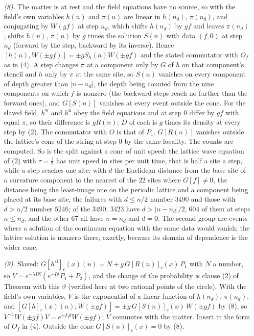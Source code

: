\emph{(8).} The matter is at rest and the field equations have no source, so with the field's own variables $h(n)$ and $\pi(n)$ are linear in $h(n_{d})$, $\pi(n_{d})$, and conjugating by $W(gf)$ at step $n_{d}$, which shifts $h(n_{d})$ by $gf$ and leaves $\pi(n_{d})$, shifts $h(n)$, $\pi(n)$ by $g$ times the solution $S(n)$ with data $(f, 0)$ at step $n_{d}$ (forward by the step, backward by its inverse). Hence $[h(n), W(\pm gf)] = \pm gS_{h}(n)W(\pm gf)$ and the stated commutator with $O_{f}$ as in (4). A step changes $\pi$ at a component only by $G$ of $h$ on that component's stencil and $h$ only by $\pi$ at the same site, so $S(n)$ vanishes on every component of depth greater than $|n - n_{d}|$, the depth being counted from the nine components on which $f$ is nonzero (the backward steps reach no further than the forward ones), and $G[S(n)]$ vanishes at every event outside the cone. For the slaved field, $h^{\mathrm{w}}$ and $h^{\mathrm{n}}$ obey the field equations and at step $0$ differ by $gf$ with equal $\pi$, so their difference is $gR(n)$; $D$ of each is $g$ times its density at every step by (2). The commutator with $O$ is that of $P_{1}$. $G[R(n)]$ vanishes outside the lattice's cone of the string at step $0$ by the same locality. The counts are computed. So is the split against a cone of unit speed: the lattice wave equation of (2) with $\tau = \tfrac12$ has unit speed in sites per unit time, that is half a site a step, while a step reaches one site; with $d$ the Euclidean distance from the base site of a curvature component to the nearest of the $22$ sites where $G[f] \neq 0$, the distance being the least-image one on the periodic lattice and a component being placed at its base site, the failures with $d \le n/2$ number $3490$ and those with $d > n/2$ number $5246$; of the $3490$, $3423$ have $d > |n - n_{d}|/2$, $604$ of them at steps $n \le n_{d}$, and the other $67$ all have $n = n_{d}$ and $d = 0$. The second group are events where a solution of the continuum equation with the same data would vanish; the lattice solution is nonzero there, exactly, because its domain of dependence is the wider cone.

\emph{(9).} Slaved: $G[h^{\mathrm{sl}}]_{c}(x)(n) = N + g\,G[R(n)]_{c}(x)\,P_{1}$ with $N$ a number, so $V = e^{-\lambda IN}(e^{-I\vartheta}P_{1} + P_{2})$, and the change of the probability is clause (2) of Theorem  with this $\vartheta$ (verified here at two rational points of the circle). With the field's own variables, $V$ is the exponential of a linear function of $h(n_{d})$, $\pi(n_{d})$, and $[G[h]_{c}(x)(n), W(\pm gf)] = \pm g\,G[S(n)]_{c}(x)\,W(\pm gf)$ by (8), so $V^{-1}W(\pm gf)V = e^{\pm I_{4}\theta}W(\pm gf)$; $V$ commutes with the matter. Insert in the form of $O_{f}$ in (4). Outside the cone $G[S(n)]_{c}(x) = 0$ by (8).

